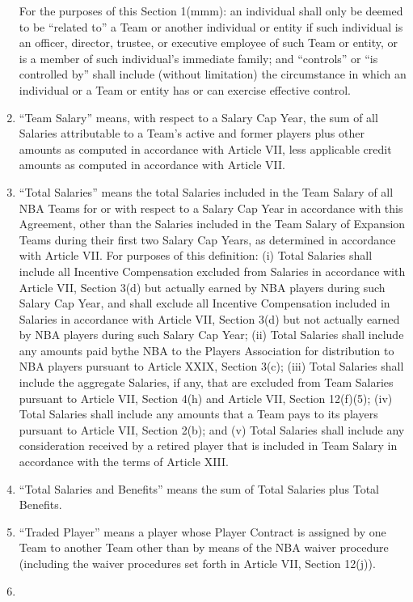 \documentclass[
]{book}
\begin{document}
\begin{enumerate}
  For the purposes of this Section 1(mmm): an individual shall only be deemed to be ``related to'' a Team or another individual or entity if such individual is an officer, director, trustee, or executive employee of such Team or entity, or is a member of such individual's immediate family; and ``controls'' or ``is controlled by'' shall include (without limitation) the circumstance in which an individual or a Team or entity has or can exercise effective control.
\item
  ``Team Salary'' means, with respect to a Salary Cap Year, the sum of all Salaries attributable to a Team's active and former players plus other amounts as computed in accordance with Article VII, less applicable credit amounts as computed in accordance with Article VII.
\item
  ``Total Salaries'' means the total Salaries included in the Team Salary of all NBA Teams for or with respect to a Salary Cap Year in accordance with this Agreement, other than the Salaries included in the Team Salary of Expansion Teams during their first two Salary Cap Years, as determined in accordance with Article VII. For purposes of this definition: (i) Total Salaries shall include all Incentive Compensation excluded from Salaries in accordance with Article VII, Section 3(d) but actually earned by NBA players during such Salary Cap Year, and shall exclude all Incentive Compensation included in Salaries in accordance with Article VII, Section 3(d) but not actually earned by NBA players during such Salary Cap Year; (ii) Total Salaries shall include any amounts paid bythe NBA to the Players Association for distribution to NBA players pursuant to Article XXIX, Section 3(c); (iii) Total Salaries shall include the aggregate Salaries, if any, that are excluded from Team Salaries pursuant to Article VII, Section 4(h) and Article VII, Section 12(f)(5); (iv) Total Salaries shall include any amounts that a Team pays to its players pursuant to Article VII, Section 2(b); and (v) Total Salaries shall include any consideration received by a retired player that is included in Team Salary in accordance with the terms of Article XIII.
\item
  ``Total Salaries and Benefits'' means the sum of Total Salaries plus Total Benefits.
\item
  ``Traded Player'' means a player whose Player Contract is assigned by one Team to another Team other than by means of the NBA waiver procedure (including the waiver procedures set forth in Article VII, Section 12(j)).
\item

\end{enumerate}
\end{document}
